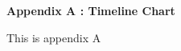 
\vspace*{5cm}
\begin{centering}
    \large
{\LARGE\bf Appendix A : Timeline Chart}\\
\end{centering}

\newpage

This is appendix A